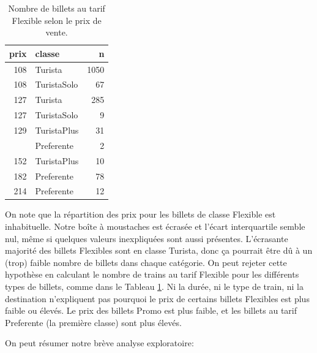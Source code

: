 \documentclass[
  11pt,
  letterpaper,
]{book}
\theoremstyle{definition}
\theoremstyle{definition}
\theoremstyle{definition}
\theoremstyle{remark}
\begin{document}
\begin{table}

\caption{\label{tab:renfeaedrep}Nombre de billets au tarif Flexible selon le prix de vente.}
\centering
\begin{tabular}[t]{rlr}
\toprule
prix & classe & n\\
\midrule
108 & Turista & 1050\\
108 & TuristaSolo & 67\\
127 & Turista & 285\\
127 & TuristaSolo & 9\\
129 & TuristaPlus & 31\\
\addlinespace
140 & Preferente & 2\\
152 & TuristaPlus & 10\\
182 & Preferente & 78\\
214 & Preferente & 12\\
\bottomrule
\end{tabular}
\end{table}

On note que la répartition des prix pour les billets de classe Flexible est inhabituelle. Notre boîte à moustaches est écrasée et l'écart interquartile semble nul, même si quelques valeurs inexpliquées sont aussi présentes. L'écrasante majorité des billets Flexibles sont en classe Turista, donc ça pourrait être dû à un (trop) faible nombre de billets dans chaque catégorie. On peut rejeter cette hypothèse en calculant le nombre de trains au tarif Flexible pour les différents types de billets, comme dans le Tableau \ref{tab:renfeaedrep}. Ni la durée, ni le type de train, ni la destination n'expliquent pas pourquoi le prix de certains billets Flexibles est plus faible ou élevés. Le prix des billets Promo est plus faible, et les billets au tarif Preferente (la première classe) sont plus élevés.

On peut résumer notre brève analyse exploratoire:
\end{document}
